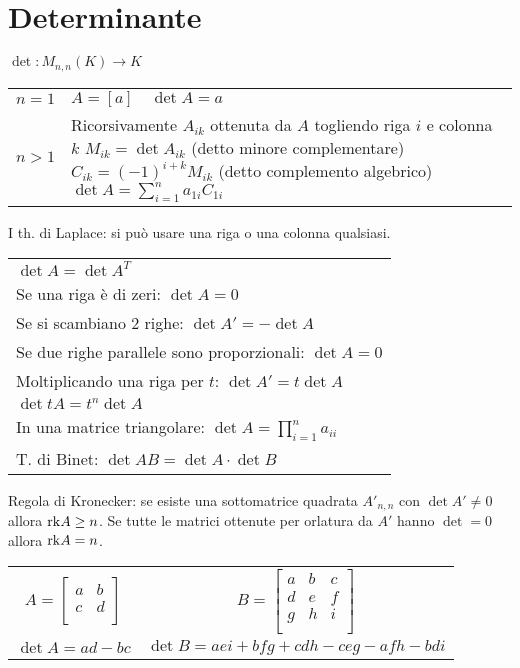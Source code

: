 \section{Determinante}
$\det: M_{n,n}(K) \rightarrow K$

\begin{tabularx}{\textwidth}{lX}
	$n = 1$ & $A = [a] \quad \det{A} = a$ \\
	$n > 1$ &
	Ricorsivamente \newline
	$A_{ik}$ ottenuta da $A$ togliendo riga $i$ e colonna $k$ \newline
	$M_{ik} = \det A_{ik}$ (detto minore complementare) \newline
	$C_{ik} = (-1)^{i+k}M_{ik}$ (detto complemento algebrico) \newline
	$\det A = \sum_{i=1}^{n} a_{1i}C_{1i}$ \\
\end{tabularx}

I th. di Laplace: si può usare una riga o una colonna qualsiasi.

\begin{tabular}{l}
	$\det A = \det A^T$ \\
	Se una riga è di zeri: $\det A = 0$ \\
	Se si scambiano 2 righe: $\det A' = -\det A$ \\
	Se due righe parallele sono proporzionali: $\det A = 0$ \\
	Moltiplicando una riga per $t$: $\det A' = t\det A$ \\
	$\det tA = t^n\det A$ \\
	In una matrice triangolare: $\det A = \prod_{i=1}^{n} a_{ii}$ \\
	T. di Binet: $\det AB = \det A \cdot \det B$
\end{tabular}

Regola di Kronecker: se esiste una sottomatrice quadrata $A'_{n,n}$ con $\det A' \ne 0$ allora $\mathrm{rk} A \ge n$.
Se tutte le matrici ottenute per orlatura da $A'$ hanno $\det = 0$ allora $\mathrm{rk} A = n$.

\begin{tabular}{cc}
	$A = \begin{bmatrix}
	a & b \\
	c & d \\
	\end{bmatrix}$ &
	$B = \begin{bmatrix}
	a & b & c \\
	d & e & f \\
	g & h & i \\
	\end{bmatrix}$ \\
	$\det A = ad - bc$ &
	$\det B = aei + bfg + cdh - ceg - afh - bdi$ \\
\end{tabular}